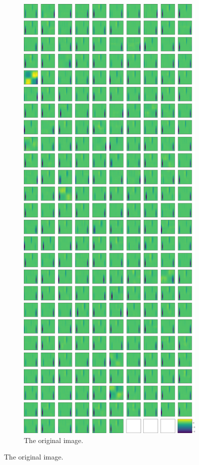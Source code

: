\documentclass{beamer}
\begin{document}
\begin{frame}
\begin{figure}
\begin{subfigure}{0.45\textwidth}
\includegraphics[height=.8\textheight]{images/stripes/test_img_9/leaky_re_lu_5.png}
\caption{The original image.}
\label{subfig:stipes_test_img_leakyrelu5}
\end{subfigure}
\hfill

\end{figure}
\end{frame}
\end{document}
